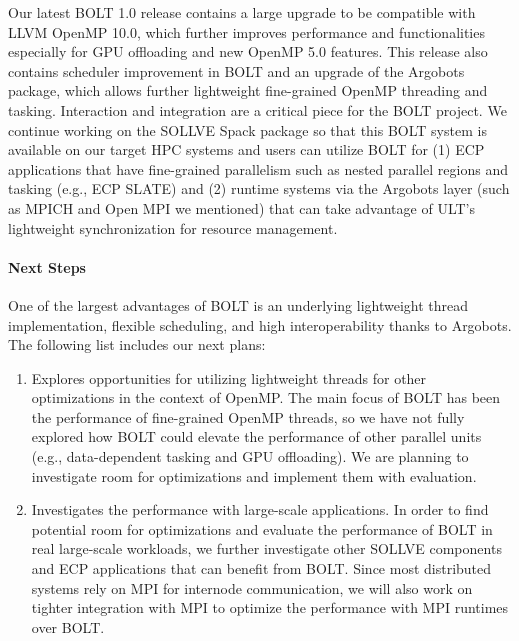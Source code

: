 Our latest BOLT 1.0 release contains a large upgrade to be compatible
with LLVM OpenMP 10.0, which further improves performance and
functionalities especially for GPU offloading and new OpenMP 5.0
features.  This release also contains scheduler improvement in BOLT
and an upgrade of the Argobots package, which allows further
lightweight fine-grained OpenMP threading and tasking.  Interaction
and integration are a critical piece for the BOLT project.  We
continue working on the SOLLVE Spack package so that this BOLT system
is available on our target HPC systems and users can utilize BOLT for
(1) ECP applications that have fine-grained parallelism such as nested
parallel regions and tasking (e.g., ECP SLATE) and (2) runtime systems
via the Argobots layer (such as MPICH and Open MPI we mentioned) that
can take advantage of ULT's lightweight synchronization for resource
management.

\paragraph{Next Steps}

One of the largest advantages of BOLT is an underlying lightweight
thread implementation, flexible scheduling, and high interoperability
thanks to Argobots. The following list includes our next plans:

\begin{enumerate}

\item Explores opportunities for utilizing lightweight threads for
other optimizations in the context of OpenMP.  The main focus of BOLT
has been the performance of fine-grained OpenMP threads, so we have
not fully explored how BOLT could elevate the performance of other
parallel units (e.g., data-dependent tasking and GPU offloading). We
are planning to investigate room for optimizations and implement them
with evaluation.

\item Investigates the performance with large-scale applications.
In order to find potential room for optimizations and evaluate the
performance of BOLT in real large-scale workloads, we further
investigate other SOLLVE components and ECP applications that can benefit from BOLT.  Since most distributed systems rely on MPI for internode
communication, we will also work on tighter integration with MPI to
optimize the performance with MPI runtimes over BOLT.

\end{enumerate}
